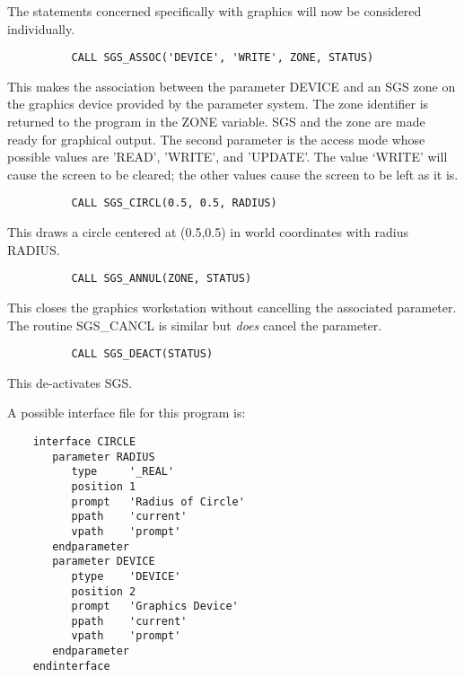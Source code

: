 The statements concerned specifically with graphics will now be considered
individually.

\begin{small}
\begin{verbatim}
          CALL SGS_ASSOC('DEVICE', 'WRITE', ZONE, STATUS)
\end{verbatim}
\end{small}

This makes the association between the parameter DEVICE and an SGS zone on the
graphics device provided by the parameter system.
The zone identifier is returned to the program in the ZONE variable.
SGS and the zone are made ready for graphical output.
The second parameter is the access mode whose possible values are 'READ',
'WRITE', and 'UPDATE'.
The value `WRITE' will cause the screen to be cleared; the other values
cause the screen to be left as it is.

\begin{small}
\begin{verbatim}
          CALL SGS_CIRCL(0.5, 0.5, RADIUS)
\end{verbatim}
\end{small}

This draws a circle centered at (0.5,0.5) in world coordinates with radius
RADIUS.

\begin{small}
\begin{verbatim}
          CALL SGS_ANNUL(ZONE, STATUS)
\end{verbatim}
\end{small}

This closes the graphics workstation without cancelling the associated
parameter. The routine SGS\_CANCL is similar but {\em does} 
cancel the parameter.

\begin{small}
\begin{verbatim}
          CALL SGS_DEACT(STATUS)
\end{verbatim}
\end{small}

This de-activates SGS.

A possible interface file for this program is:

\begin{small}
\begin{verbatim}
    interface CIRCLE
       parameter RADIUS
          type     '_REAL'
          position 1
          prompt   'Radius of Circle'
          ppath    'current'
          vpath    'prompt'
       endparameter
       parameter DEVICE
          ptype    'DEVICE'
          position 2
          prompt   'Graphics Device'
          ppath    'current'
          vpath    'prompt'
       endparameter
    endinterface
\end{verbatim}
\end{small}

